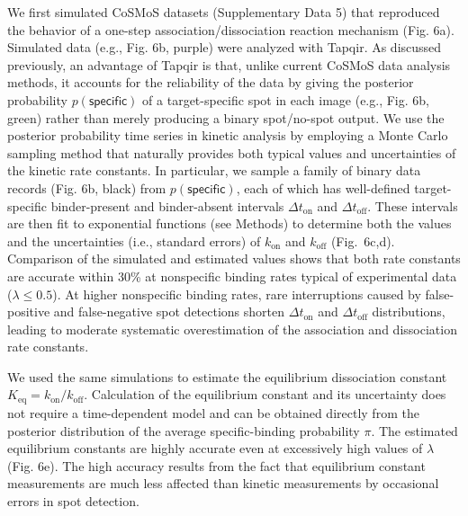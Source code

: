 We first simulated CoSMoS datasets (Supplementary Data 5) that reproduced the behavior of a one-step association/dissociation reaction mechanism (Fig. 6a). Simulated data (e.g., Fig. 6b, purple) were analyzed with Tapqir.   As discussed previously, an advantage of Tapqir is that, unlike current CoSMoS data analysis methods, it accounts for the reliability of the data by giving the posterior probability $p(\mathsf{specific})$ of a target-specific spot in each image (e.g., Fig. 6b, green) rather than merely producing a binary spot/no-spot output.  We use the posterior probability time series in kinetic analysis by employing a Monte Carlo sampling method that naturally provides both typical values and uncertainties of the kinetic rate constants.  In particular, we sample a family of binary data records (Fig. 6b, black) from $p(\mathsf{specific})$, each of which has well-defined target-specific binder-present and binder-absent intervals $\Delta t_\mathrm{on}$ and $\Delta t_\mathrm{off}$. These intervals are then fit to exponential functions (see Methods) to determine both the values and the uncertainties (i.e., standard errors) of $k_\mathrm{on}$ and $k_\mathrm{off}$ (Fig.~6c,d). Comparison of the simulated and estimated values shows that both rate constants are accurate within 30\% at nonspecific binding rates typical of experimental data ($\lambda \leq 0.5$). At higher nonspecific binding rates, rare interruptions caused by false-positive and false-negative spot detections shorten $\Delta t_\mathrm{on}$ and $\Delta t_\mathrm{off}$ distributions, leading to moderate systematic overestimation of the association and dissociation rate constants.

We used the same simulations to estimate the equilibrium dissociation constant $K_\mathrm{eq} = k_\mathrm{on}/k_\mathrm{off}$.  Calculation of the equilibrium constant and its uncertainty does not require a time-dependent model and can be obtained directly from the posterior distribution of the average specific-binding probability $\pi$. The estimated equilibrium constants are highly accurate even at excessively  high values of $\lambda$ (Fig. 6e).  The high accuracy results from the fact that equilibrium constant measurements are much less affected than kinetic measurements by occasional errors in spot detection. 

